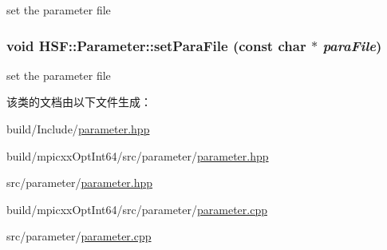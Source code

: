set the parameter file \hypertarget{classHSF_1_1Parameter_a535c67d4b12636e498b98d3e6f0723d1}{
\subsubsection[{setParaFile}]{\setlength{\rightskip}{0pt plus 5cm}void HSF::Parameter::setParaFile (const char $\ast$ {\em paraFile})}}
\label{classHSF_1_1Parameter_a535c67d4b12636e498b98d3e6f0723d1}


set the parameter file 

该类的文档由以下文件生成：\begin{DoxyCompactItemize}
\item 
build/Include/\hyperlink{build_2Include_2parameter_8hpp}{parameter.hpp}\item 
build/mpicxxOptInt64/src/parameter/\hyperlink{build_2mpicxxOptInt64_2src_2parameter_2parameter_8hpp}{parameter.hpp}\item 
src/parameter/\hyperlink{src_2parameter_2parameter_8hpp}{parameter.hpp}\item 
build/mpicxxOptInt64/src/parameter/\hyperlink{build_2mpicxxOptInt64_2src_2parameter_2parameter_8cpp}{parameter.cpp}\item 
src/parameter/\hyperlink{src_2parameter_2parameter_8cpp}{parameter.cpp}\end{DoxyCompactItemize}
